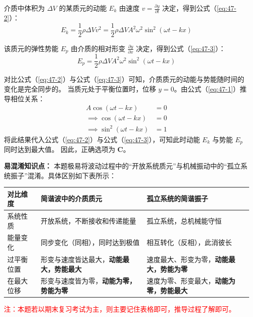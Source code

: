 介质中体积为 $\Delta V$ 的某质元的动能 $E_k$ 由速度 $v = \frac{\partial y}{\partial t}$ 决定，得到公式（\ref{eq:47-2}）：
\begin{equation}\label{eq:47-2}
	E_k = \frac{1}{2} \rho \Delta V v^2 = \frac{1}{2} \rho \Delta V A^2 \omega^2 \sin^2(\omega t - kx)
\end{equation}

该质元的弹性势能 $E_p$ 由介质的相对形变 $\frac{\partial y}{\partial x}$ 决定，得到公式（\ref{eq:47-3}）：
\begin{equation}\label{eq:47-3}
	E_p = \frac{1}{2} \rho \Delta V A^2 \omega^2 \sin^2(\omega t - kx)
\end{equation}

对比公式（\ref{eq:47-2}）与公式（\ref{eq:47-3}）可知，介质质元的动能与势能随时间的变化是完全同步的。
当质元处于平衡位置时，位移 $y=0$。由公式（\ref{eq:47-1}）推导相位关系：
\begin{align*}
	A \cos(\omega t - kx) &= 0 \\
	\implies \cos(\omega t - kx) &= 0 \\
	\implies \sin^2(\omega t - kx) &= 1
\end{align*}
将此结果代入公式（\ref{eq:47-2}）与公式（\ref{eq:47-3}），可知此时动能 $E_k$ 与势能 $E_p$ 同时达到最大值。
因此，正确选项为 \textbf{C}。

\textbf{易混淆知识点：}
本题极易将波动过程中的“开放系统质元”与机械振动中的“孤立系统振子”混淆。具体区别如下表所示：

\begin{table}[htbp]
	\centering
	\small
	\renewcommand{\arraystretch}{1.4}
	\begin{tabular}{|p{2.2cm}|p{5.5cm}|p{5.5cm}|}
		\hline
		\textbf{对比维度} & \textbf{简谐波中的介质质元} & \textbf{孤立系统的简谐振子} \\ \hline
		系统性质 & 开放系统，不断接收和传递能量 & 孤立系统，总机械能守恒 \\ \hline
		能量变化 & 同步变化（同相），同时达到极值 & 相互转化（反相），此消彼长 \\ \hline
		过平衡位置 & 形变与速度皆达最大，\textbf{动能最大，势能最大} & 速度最大、形变为零，\textbf{动能最大，势能为零} \\ \hline
		在最大位移 & 形变与速度皆为零，\textbf{动能为零，势能为零} & 速度为零、形变最大，\textbf{动能为零，势能最大} \\ \hline
	\end{tabular}
\end{table}
\textcolor{red}{注：本题若以期末复习考试为主，则主要记住表格即可，推导过程了解即可。}

